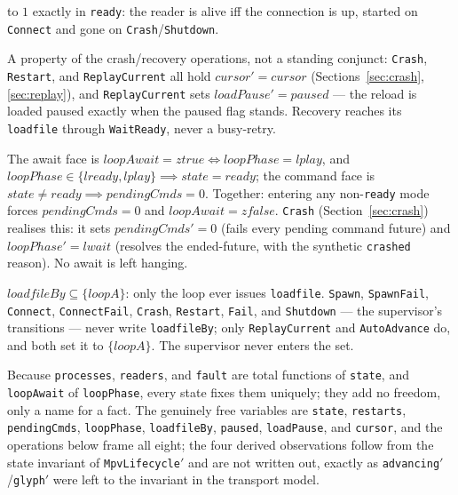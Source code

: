 \documentclass[a4paper,10pt,fleqn]{article}
\begin{document}
\begin{description}
    to $1$ exactly in \texttt{ready}: the reader is alive iff the connection is
    up, started on \texttt{Connect} and gone on \texttt{Crash}/\texttt{Shutdown}.
  \item[\texttt{I6} --- the lifecycle does not corrupt the cursor, and recovery
    honours pause.] A property of the crash/recovery operations, not a standing
    conjunct: \texttt{Crash}, \texttt{Restart}, and \texttt{ReplayCurrent} all
    hold $cursor' = cursor$ (Sections~\ref{sec:crash}, \ref{sec:replay}), and
    \texttt{ReplayCurrent} sets $loadPause' = paused$ --- the reload is loaded
    paused exactly when the paused flag stands. Recovery reaches its
    \texttt{loadfile} through \texttt{WaitReady}, never a busy-retry.
  \item[\texttt{I7} --- no orphaned await across a crash.] The await face is
    $loopAwait = ztrue \iff loopPhase = lplay$, and $loopPhase \in \{ lready,
    lplay \} \implies state = ready$; the command face is $state \neq ready
    \implies pendingCmds = 0$. Together: entering any non-\texttt{ready} mode
    forces $pendingCmds = 0$ and $loopAwait = zfalse$. \texttt{Crash}
    (Section~\ref{sec:crash}) realises this: it sets $pendingCmds' = 0$ (fails
    every pending command future) and $loopPhase' = lwait$ (resolves the
    ended-future, with the synthetic \texttt{crashed} reason). No await is left
    hanging.
  \item[\emph{single-loadfile-ownership}.] $loadfileBy \subseteq \{ loopA \}$:
    only the loop ever issues \texttt{loadfile}. \texttt{Spawn},
    \texttt{SpawnFail}, \texttt{Connect}, \texttt{ConnectFail}, \texttt{Crash},
    \texttt{Restart}, \texttt{Fail}, and \texttt{Shutdown} --- the supervisor's
    transitions --- never write \texttt{loadfileBy}; only
    \texttt{ReplayCurrent} and \texttt{AutoAdvance} do, and both set it to
    $\{ loopA \}$. The supervisor never enters the set.
\end{description}

Because \texttt{processes}, \texttt{readers}, and \texttt{fault} are total
functions of \texttt{state}, and \texttt{loopAwait} of \texttt{loopPhase},
every state fixes them uniquely; they add no freedom, only a name for a fact.
The genuinely free variables are \texttt{state}, \texttt{restarts},
\texttt{pendingCmds}, \texttt{loopPhase}, \texttt{loadfileBy}, \texttt{paused},
\texttt{loadPause}, and \texttt{cursor}, and the operations below frame all
eight; the four derived observations follow from the state invariant of
\texttt{MpvLifecycle$'$} and are not written out, exactly as
\texttt{advancing$'$}/\texttt{glyph$'$} were left to the invariant in the
transport model.
\end{document}
